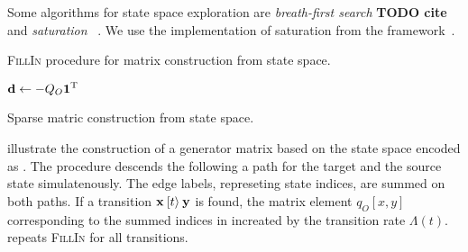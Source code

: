 Some algorithms for  state space exploration are
\emph{breath-first search} \textbf{TODO cite} and \emph{saturation}%
~\citep{Ciardo:2006}. We use the implementation of saturation from the
 framework~\citep{TDK2010_Darvas,Petridotnet}.

\begin{algorithm}
  \caption{\textsc{FillIn} procedure for matrix construction from
     state space.}
  \label{alg:genstor:symbolic:fillin}
\end{algorithm}

\begin{algorithm}
  \;
  $\bm{\mathrm{d}} \gets -Q_O \bm{\mathrm{1}}^{\mathrm{T}}$\;
  \;
  \caption{Sparse matric construction from  state space.}
  \label{alg:genstor:symbolic:sparse}
\end{algorithm}

illustrate the construction of a generator matrix based on the state
space encoded as . The procedure  descends
the  following a path for the target and the source
state simulatenously. The edge labels, represeting state indices, are
summed on both paths. If a transition $\bm{\mathrm{x}} \mathbin{[t\rangle} \bm{\mathrm{y}}$ is
found, the matrix element $q_O[x, y]$ corresponding to the summed
indices in increated by the transition rate
$\Lambda(t)$.  repeats
\textsc{FillIn} for all transitions.

